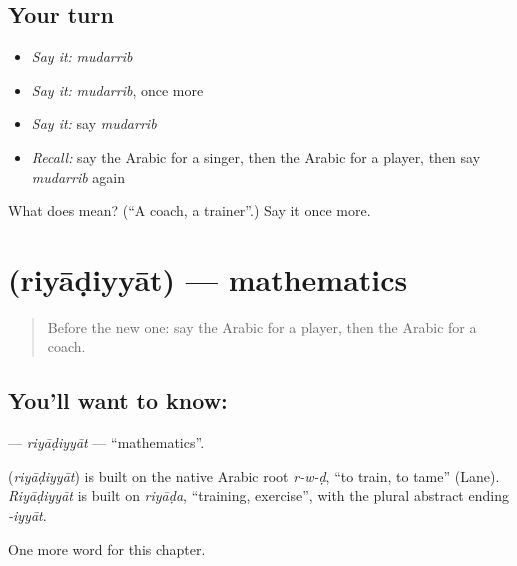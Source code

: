 \subsection*{Your turn}
\begin{itemize}
\raggedright
  \item \emph{Say it:} \emph{mudarrib}
  \item \emph{Say it:} \emph{mudarrib}, once more
  \item \emph{Say it:} say \emph{mudarrib}
  \item \emph{Recall:} say the Arabic for a singer, then the Arabic for a player, then say \emph{mudarrib} again
\end{itemize}

\begin{tcolorbox}[breakable,colback=teal!4,colframe=teal!35!black,title={Before you move on}]
What does  mean? (\textquotedblleft{}A coach, a trainer\textquotedblright{}.) Say it once more.
\end{tcolorbox}
\section[\texorpdfstring{\ar{رياضيات} (riyāḍiyyāt)}{رياضيات (riyāḍiyyāt)}]{ (riyāḍiyyāt) — mathematics}

\label{lesson:AR-C190-riyadiyyat}



\begin{quote}
Before the new one: say the Arabic for a player, then the Arabic for a coach.
\end{quote}

\subsection*{You'll want to know: }
\textbf{} — \emph{riyāḍiyyāt} — \textquotedblleft{}mathematics\textquotedblright{}.

\begin{cousinweb}
\textbf{} (\emph{riyāḍiyyāt}) is built on the native Arabic root \emph{r-w-ḍ}, \textquotedblleft{}to train, to tame\textquotedblright{} (Lane). \emph{Riyāḍiyyāt} is built on \emph{riyāḍa}, \textquotedblleft{}training, exercise\textquotedblright{}, with the plural abstract ending \emph{-iyyāt}.
\end{cousinweb}

\begin{grammarlens}[title={What you've built}]
One more word for this chapter.
\end{grammarlens}


